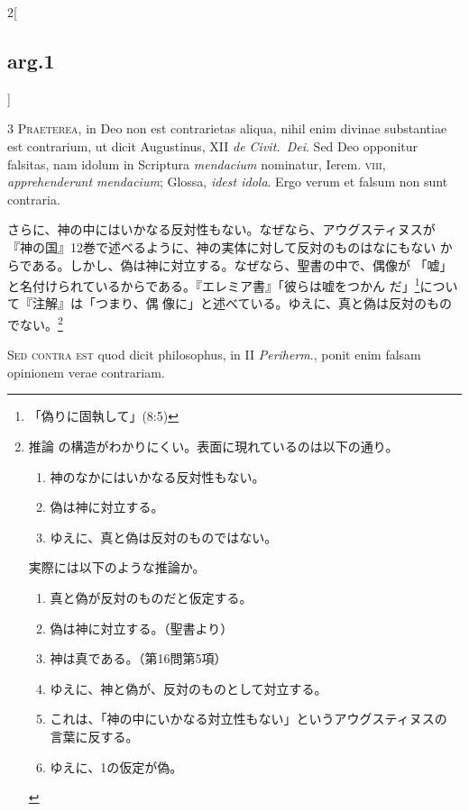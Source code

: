 \documentclass[paper=a4paper,fontsize=10pt,jafontsize=9pt,titlepage]{jlreq}
\begin{document}
\begin{paracol}{2}[\subsection{arg.1}]


{\scshape 3 Praeterea}, in Deo non est contrarietas aliqua, nihil enim
 divinae substantiae est contrarium, ut dicit Augustinus, XII
 {\itshape de Civit.~Dei}. Sed Deo opponitur falsitas, nam idolum in
 Scriptura {\itshape mendacium} nominatur, Ierem. {\scshape viii},
 {\itshape apprehenderunt mendacium}; Glossa, {\itshape idest
 idola}. Ergo verum et falsum non sunt contraria.

\switchcolumn

さらに、神の中にはいかなる反対性もない。なぜなら、アウグスティヌスが
 『神の国』12巻で述べるように、神の実体に対して反対のものはなにもない
 からである。しかし、偽は神に対立する。なぜなら、聖書の中で、偶像が
 「嘘」と名付けられているからである。『エレミア書』「彼らは嘘をつかん
 だ」\footnote{「偽りに固執して」(8:5)}について『注解』は「つまり、偶
 像に」と述べている。ゆえに、真と偽は反対のものでない。\footnote{推論
 の構造がわかりにくい。表面に現れているのは以下の通り。
\begin{enumerate}
 \item 神のなかにはいかなる反対性もない。
 \item 偽は神に対立する。
 \item ゆえに、真と偽は反対のものではない。
\end{enumerate}
実際には以下のような推論か。
\begin{enumerate}
 \item 真と偽が反対のものだと仮定する。
 \item 偽は神に対立する。（聖書より）
 \item 神は真である。（第16問第5項）
 \item ゆえに、神と偽が、反対のものとして対立する。
 \item これは、「神の中にいかなる対立性もない」というアウグスティヌスの
       言葉に反する。
 \item ゆえに、1の仮定が偽。
\end{enumerate}
}

\switchcolumn*[\subsection{s.c.}]


{\scshape Sed contra est} quod dicit philosophus, in II {\itshape
Periherm}., ponit enim falsam opinionem verae contrariam.


\end{paracol}
\end{document}
